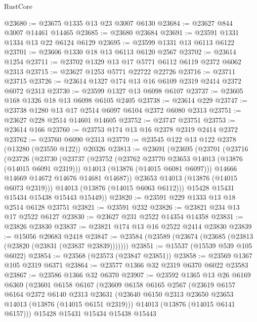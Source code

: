 \begin{lexlean}{RustCore}
\begin{coremodule}
@23680 := @23675 @1335 @13 @23 @3007 @6130
@23684 := @23627 @844 @3007 @14461 @14465
@23685 := @23680 @23684
@23691 := @23591 @1331 @1334 @13 @22 @6124 @6129
@23695 := @23599 @1331 @13 @6113 @6122
@23701 := @23606 @1330 @18 @13 @6113 @6120 @2567
@23702 := @23614 @1254
@23711 := @23702 @1329 @13 @17 @5771 @6112 @6119 @2372 @6062 @2313
@23715 := @23627 @1253 @5771 @22722 @22726
@23716 := @23711 @23715
@23726 := @23614 @1327 @174 @13 @16 @6109 @2319 @2414 @2372 @6072 @2313
@23730 := @23599 @1327 @13 @6098 @6107
@23737 := @23605 @168 @1326 @18 @13 @6098 @6105 @2405
@23738 := @23614 @229
@23747 := @23738 @1280 @13 @17 @2514 @6097 @6104 @2372 @6080 @2313
@23751 := @23627 @228 @2514 @14601 @14605
@23752 := @23747 @23751
@23753 := @23614 @166
@23760 := @23753 @174 @13 @16 @2378 @2319 @2414 @2372
@23762 := @23760 @6090 @2313
@23770 := @23545 @122 @13 @122 @2378 (@13280 (@23550 @122)) @20326
@23813 := @23691
    (@23695
      (@23701
        (@23716
          (@23726
            (@23730
              (@23737
                (@23752
                  (@23762 @23770 @23653 @14013 (@13876 (@14015 @6091 @2319)))
                  @14013
                  (@13876 (@14015 @6081 @6097)))
                @14666
                @14669
                @14672
                @14676
                @14681
                @14687))
            @23653
            @14013
            (@13876 (@14015 @6073 @2319)))
          @14013
          (@13876 (@14015 @6063 @6112)))
        @15428
        @15431
        @15434
        @15438
        @15443
        @15449))
@23820 := @23591 @229 @1333 @13 @18 @2514 @6128 @23751
@23821 := @23591 @232
@23826 := @23821 @234 @13 @17 @2522 @6127
@23830 := @23627 @231 @2522 @14354 @14358
@23831 := @23826 @23830
@23837 := @23821 @174 @13 @16 @2522 @2414 @23830
@23839 := @15056 @20683 @2418
@23847 := @23584 (@23589 (@23674 (@23685 (@23813 (@23820 (@23831 (@23837 @23839)))))))
@23851 := @15537 (@15539 @539 @105 @6022)
@23854 := @23568 (@23573 (@23847 @23851))
@23858 := @23569 @1367 @105 @2319 @6371
@23864 := @23577 @1366 @32 @2319 @6370 @6022 @23583
@23867 := @23586 @1366 @32 @6370
@23907 := @23592
    @1365
    @13
    @26
    @6169
    @6369
    (@23601
      @6158
      @6167
      (@23609
        @6158
        @6165
        @2567
        (@23619
          @6157
          @6164
          @2372
          @6140
          @2313
          @23631
          (@23640 @6150 @2313 @23650 @23653 @14013 (@13876 (@14015 @6151 @2319)))
          @14013
          (@13876 (@14015 @6141 @6157)))
        @15428
        @15431
        @15434
        @15438
        @15443

\end{coremodule}
\end{lexlean}
